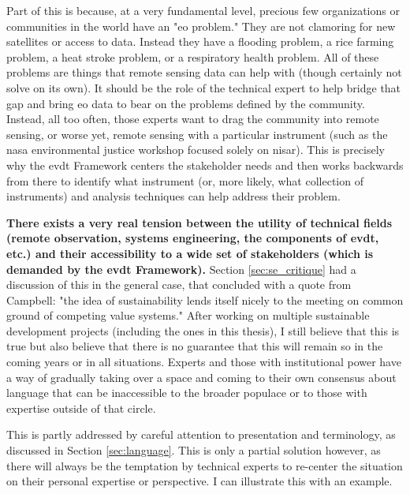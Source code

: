 Part of this is because, at a very fundamental level, precious few organizations or communities in the world have an "\ac{eo} problem." They are not clamoring for new satellites or access to data. Instead they have a flooding problem, a rice farming problem, a heat stroke problem, or a respiratory health problem. All of these problems are things that remote sensing data can help with (though certainly not solve on its own). It should be the role of the technical expert to help bridge that gap and bring \ac{eo} data to bear on the problems defined by the community. Instead, all too often, those experts want to drag the community into remote sensing, or worse yet, remote sensing with a particular instrument (such as the \ac{nasa} environmental justice workshop focused solely on \ac{nisar}). This is precisely why the \ac{evdt} Framework centers the stakeholder needs and then works backwards from there to identify what instrument (or, more likely, what collection of instruments) and analysis techniques can help address their problem.

\textbf{There exists a very real tension between the utility of technical fields (remote observation, systems engineering, the components of \ac{evdt}, etc.) and their accessibility to a wide set of stakeholders (which is demanded by the \ac{evdt} Framework).} Section \ref{sec:se_critique} had a discussion of this in the general case, that concluded with a quote from Campbell: "the idea of sustainability lends itself nicely to the meeting on common ground of competing value systems." After working on multiple sustainable development projects (including the ones in this thesis), I still believe that this is true but also believe that there is no guarantee that this will remain so in the coming years or in all situations. Experts and those with institutional power have a way of gradually taking over a space and coming to their own consensus about language that can be inaccessible to the broader populace or to those with expertise outside of that circle.

This is partly addressed by careful attention to presentation and terminology, as discussed in Section \ref{sec:language}. This is only a partial solution however, as there will always be the temptation by technical experts to re-center the situation on their personal expertise or perspective. I can illustrate this with an example.

